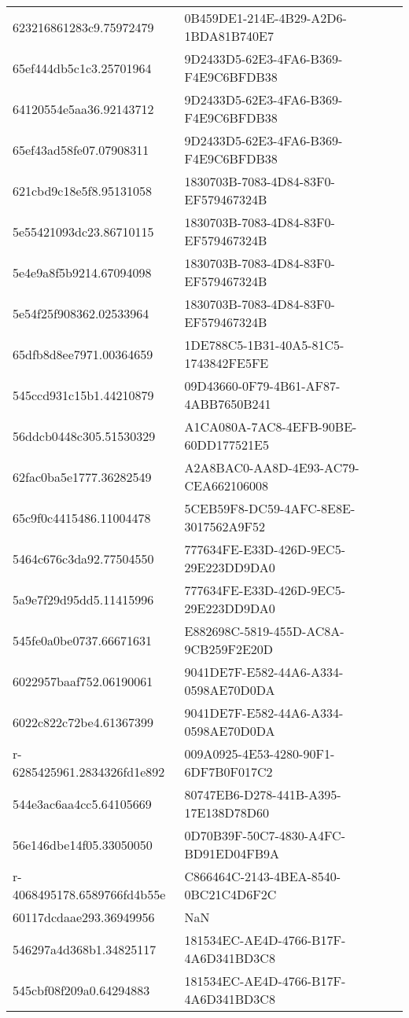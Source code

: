 \begin{tabular}{ll}
623216861283c9.75972479 & 0B459DE1-214E-4B29-A2D6-1BDA81B740E7 \\
65ef444db5c1c3.25701964 & 9D2433D5-62E3-4FA6-B369-F4E9C6BFDB38 \\
64120554e5aa36.92143712 & 9D2433D5-62E3-4FA6-B369-F4E9C6BFDB38 \\
65ef43ad58fe07.07908311 & 9D2433D5-62E3-4FA6-B369-F4E9C6BFDB38 \\
621cbd9c18e5f8.95131058 & 1830703B-7083-4D84-83F0-EF579467324B \\
5e55421093dc23.86710115 & 1830703B-7083-4D84-83F0-EF579467324B \\
5e4e9a8f5b9214.67094098 & 1830703B-7083-4D84-83F0-EF579467324B \\
5e54f25f908362.02533964 & 1830703B-7083-4D84-83F0-EF579467324B \\
65dfb8d8ee7971.00364659 & 1DE788C5-1B31-40A5-81C5-1743842FE5FE \\
545ccd931c15b1.44210879 & 09D43660-0F79-4B61-AF87-4ABB7650B241 \\
56ddcb0448c305.51530329 & A1CA080A-7AC8-4EFB-90BE-60DD177521E5 \\
62fac0ba5e1777.36282549 & A2A8BAC0-AA8D-4E93-AC79-CEA662106008 \\
65c9f0c4415486.11004478 & 5CEB59F8-DC59-4AFC-8E8E-3017562A9F52 \\
5464c676c3da92.77504550 & 777634FE-E33D-426D-9EC5-29E223DD9DA0 \\
5a9e7f29d95dd5.11415996 & 777634FE-E33D-426D-9EC5-29E223DD9DA0 \\
545fe0a0be0737.66671631 & E882698C-5819-455D-AC8A-9CB259F2E20D \\
6022957baaf752.06190061 & 9041DE7F-E582-44A6-A334-0598AE70D0DA \\
6022c822c72be4.61367399 & 9041DE7F-E582-44A6-A334-0598AE70D0DA \\
r-6285425961.2834326fd1e892 & 009A0925-4E53-4280-90F1-6DF7B0F017C2 \\
544e3ac6aa4cc5.64105669 & 80747EB6-D278-441B-A395-17E138D78D60 \\
56e146dbe14f05.33050050 & 0D70B39F-50C7-4830-A4FC-BD91ED04FB9A \\
r-4068495178.6589766fd4b55e & C866464C-2143-4BEA-8540-0BC21C4D6F2C \\
60117dcdaae293.36949956 & NaN \\
546297a4d368b1.34825117 & 181534EC-AE4D-4766-B17F-4A6D341BD3C8 \\
545cbf08f209a0.64294883 & 181534EC-AE4D-4766-B17F-4A6D341BD3C8 \\

\end{tabular}

